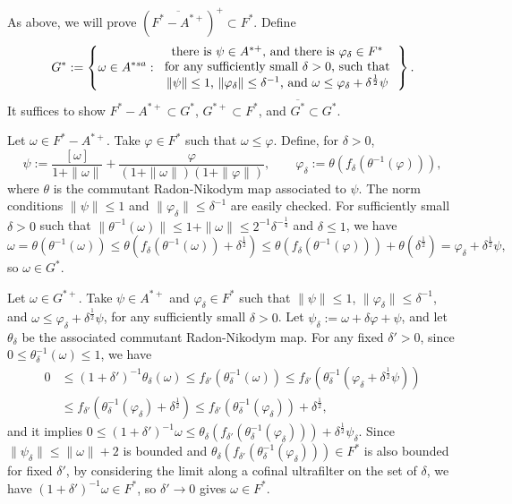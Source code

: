 \documentclass{../../../../small}
\begin{document}
\begin{pf}[Proof of (d)]

As above, we will prove $(\overline{F^*-A^{*+}})^+\subset F^*$.
Define
\[G^*:=\left\{\omega\in A^{*sa}:\begin{tabular}{c}
there is $\psi\in A^{*+}$, and there is $\varphi_\delta\in F^*$ \\
for any sufficiently small $\delta>0$,
such that\\
$\|\psi\|\le1$, $\|\varphi_\delta\|\le\delta^{-1}$, and $\omega\le\varphi_\delta+\delta^{\frac12}\psi$
\end{tabular}\right\}.\]
It suffices to show $F^*-A^{*+}\subset G^*$, $G^{*+}\subset F^*$, and $\overline{G^*}\subset G^*$.

Let $\omega\in F^*-A^{*+}$.
Take $\varphi\in F^*$ such that $\omega\le\varphi$.
Define, for $\delta>0$,
\[\psi:=\frac{[\omega]}{1+\|\omega\|}+\frac\varphi{(1+\|\omega\|)(1+\|\varphi\|)},\qquad\varphi_\delta:=\theta(f_\delta(\theta^{-1}(\varphi))),\]
where $\theta$ is the commutant Radon-Nikodym map associated to $\psi$.
The norm conditions $\|\psi\|\le1$ and $\|\varphi_\delta\|\le\delta^{-1}$ are easily checked.
For sufficiently small $\delta>0$ such that $\|\theta^{-1}(\omega)\|\le1+\|\omega\|\le2^{-1}\delta^{-\frac14}$ and $\delta\le1$, we have
\[\omega=\theta(\theta^{-1}(\omega))\le\theta(f_\delta(\theta^{-1}(\omega))+\delta^{\frac12})\le\theta(f_\delta(\theta^{-1}(\varphi)))+\theta(\delta^{\frac12})=\varphi_\delta+\delta^{\frac12}\psi,\]
so $\omega\in G^*$.

Let $\omega\in G^{*+}$.
Take $\psi\in A^{*+}$ and $\varphi_\delta\in F^*$ such that $\|\psi\|\le1$, $\|\varphi_\delta\|\le\delta^{-1}$, and $\omega\le\varphi_\delta+\delta^{\frac12}\psi$, for any sufficiently small $\delta>0$.
Let $\psi_\delta:=\omega+\delta\varphi+\psi$, and let $\theta_\delta$ be the associated commutant Radon-Nikodym map.
For any fixed $\delta'>0$, since $0\le\theta_\delta^{-1}(\omega)\le1$, we have
\begin{align*}
0&\le(1+\delta')^{-1}\theta_\delta(\omega)\le f_{\delta'}(\theta_\delta^{-1}(\omega))\le f_{\delta'}(\theta_\delta^{-1}(\varphi_\delta+\delta^{\frac12}\psi))\\
&\le f_{\delta'}(\theta_\delta^{-1}(\varphi_\delta)+\delta^{\frac12})\le f_{\delta'}(\theta_\delta^{-1}(\varphi_\delta))+\delta^{\frac12},
\end{align*}
and it implies $0\le(1+\delta')^{-1}\omega\le\theta_\delta(f_{\delta'}(\theta_\delta^{-1}(\varphi_\delta)))+\delta^{\frac12}\psi_\delta$.
Since $\|\psi_\delta\|\le\|\omega\|+2$ is bounded and $\theta_\delta(f_{\delta'}(\theta_\delta^{-1}(\varphi_\delta)))\in F^*$ is also bounded for fixed $\delta'$, by considering the limit along a cofinal ultrafilter on the set of $\delta$, we have $(1+\delta')^{-1}\omega\in F^*$, so $\delta'\to0$ gives $\omega\in F^*$.


\end{pf}
\end{document}
